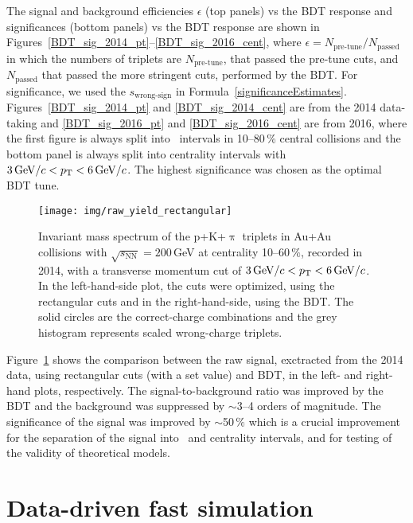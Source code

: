 The signal and background efficiencies $\epsilon$ (top panels) vs the BDT response and significances (bottom panels) vs the BDT response are shown in Figures~\ref{BDT_sig_2014_pt}--\ref{BDT_sig_2016_cent}, where $\epsilon = N_\text{pre-tune}/N_\text{passed}$ in which the numbers of triplets are $N_\text{pre-tune}$, that passed the pre-tune cuts, and $N_\text{passed}$ that passed the more stringent cuts, performed by the BDT\@. For significance, we used the $s_\text{wrong-sign}$ in Formula~\eqref{significanceEstimates}\@. Figures~\ref{BDT_sig_2014_pt} and \ref{BDT_sig_2014_cent} are from the 2014 data-taking and \ref{BDT_sig_2016_pt} and \ref{BDT_sig_2016_cent} are from 2016, where the first figure is always split into \pt\ intervals in 10--80\,\% central collisions and the bottom panel is always split into centrality intervals with $3\,\text{GeV}/c < {p_{\mathrm{T}}} < 6\,\text{GeV}/c$\@. The highest significance was chosen as the optimal BDT tune.

\begin{figure}[!htb]
\centering
\texttt{[image: img/raw\_yield\_rectangular]}
\caption{\label{fig:bdt_vs_rect} Invariant mass spectrum of the p+K+$\uppi$ triplets in Au+Au collisions with $\sqrt{s_\mathrm{NN}} = 200\,$GeV at centrality 10--60$\,\%$, recorded in 2014, with a transverse momentum cut of $3\,\text{GeV}/c < {p_{\mathrm{T}}} < 6\,\text{GeV}/c$\@. In the left-hand-side plot, the cuts were optimized, using the rectangular cuts and in the right-hand-side, using the BDT\@. The solid circles are the correct-charge combinations and the grey histogram represents scaled wrong-charge triplets.}

\end{figure}

Figure~\ref{fig:bdt_vs_rect} shows the comparison between the raw signal, exctracted from the 2014 data, using rectangular cuts (with a set value) and BDT, in the left- and right-hand plots, respectively. The signal-to-background ratio was improved by the BDT and the background was suppressed by $\sim$3--4 orders of magnitude. The significance of the signal was improved by $\sim$50$\,\%$ which is a crucial improvement for the separation of the signal into \pt\ and centrality intervals, and for testing of the validity of theoretical models.



\section{Data-driven fast simulation\label{fastsim}}

